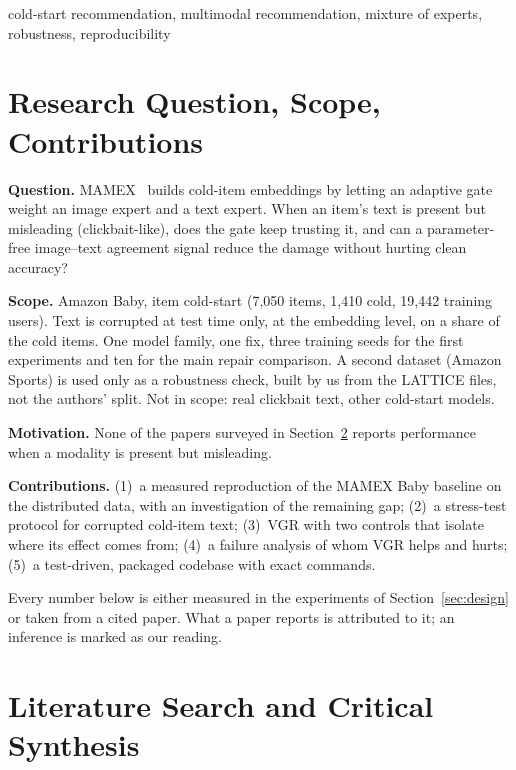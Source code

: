 \documentclass[conference]{IEEEtran}
\begin{document}
\begin{IEEEkeywords}
cold-start recommendation, multimodal recommendation, mixture of experts, robustness, reproducibility
\end{IEEEkeywords}

\section{Research Question, Scope, Contributions}

\textbf{Question.} MAMEX~\cite{nguyen2025mamex} builds cold-item embeddings by letting an adaptive gate weight an image expert and a text expert. When an item's text is present but misleading (clickbait-like), does the gate keep trusting it, and can a parameter-free image--text agreement signal reduce the damage without hurting clean accuracy?

\textbf{Scope.} Amazon Baby, item cold-start (7,050 items, 1,410 cold, 19,442 training users). Text is corrupted at test time only, at the embedding level, on a share of the cold items. One model family, one fix, three training seeds for the first experiments and ten for the main repair comparison. A second dataset (Amazon Sports) is used only as a robustness check, built by us from the LATTICE files, not the authors' split. Not in scope: real clickbait text, other cold-start models.

\textbf{Motivation.} None of the papers surveyed in Section~\ref{sec:lit} reports performance when a modality is present but misleading.

\textbf{Contributions.} (1)~a measured reproduction of the MAMEX Baby baseline on the distributed data, with an investigation of the remaining gap; (2)~a stress-test protocol for corrupted cold-item text; (3)~VGR with two controls that isolate where its effect comes from; (4)~a failure analysis of whom VGR helps and hurts; (5)~a test-driven, packaged codebase with exact commands.

Every number below is either measured in the experiments of Section~\ref{sec:design} or taken from a cited paper. What a paper reports is attributed to it; an inference is marked as our reading.

\section{Literature Search and Critical Synthesis}
\label{sec:lit}
\end{document}
